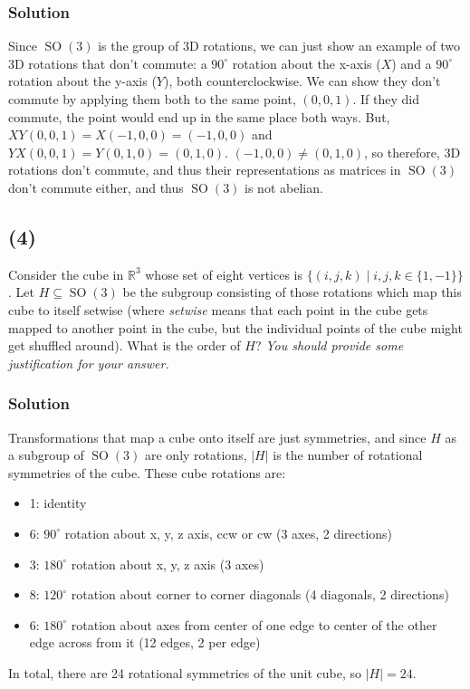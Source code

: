 \documentclass[fleqn]{article}
\DeclareMathOperator{\SO}{SO}
\begin{document}
            \subsubsection{Solution}
            Since $\SO(3)$ is the group of 3D rotations, we can just show an example of two 3D rotations that don't commute: a $90^{\circ}$ rotation about the x-axis ($X$) and a $90^{\circ}$ rotation about the y-axis ($Y$), both counterclockwise.  We can show they don't commute by applying them both to the same point, $(0, 0, 1)$.  If they did commute, the point would end up in the same place both ways.  But, $XY (0, 0, 1) = X (-1, 0, 0) = (-1, 0, 0)$ and $YX (0, 0, 1) = Y (0, 1, 0) = (0, 1, 0)$.  $(-1, 0, 0) \neq (0, 1, 0)$, so therefore, 3D rotations don't commute, and thus their representations as matrices in $\SO(3)$ don't commute either, and thus $\SO(3)$ is not abelian.
        
        \subsection{(4)}
        Consider the cube in $\mathbb{R}^3$ whose set of eight vertices is $\{(i, j, k) \mid i, j, k \in \{1, -1\}\}$.  Let $H \subseteq \SO(3)$ be the subgroup consisting of those rotations which map this cube to itself setwise (where \textit{setwise} means that each point in the cube gets mapped to another point in the cube, but the individual points of the cube might get shuffled around).  What is the order of $H$?  \textit{You should provide some justification for your answer.}
            
            \subsubsection{Solution}
            Transformations that map a cube onto itself are just symmetries, and since $H$ as a subgroup of $\SO(3)$ are only rotations, $|H|$ is the number of rotational symmetries of the cube.  These cube rotations are:
            \begin{itemize}
                \item 1: identity
                \item 6: $90^{\circ}$ rotation about x, y, z axis, ccw or cw (3 axes, 2 directions)
                \item 3: $180^{\circ}$ rotation about x, y, z axis (3 axes)
                \item 8: $120^{\circ}$ rotation about corner to corner diagonals (4 diagonals, 2 directions)
                \item 6: $180^{\circ}$ rotation about axes from center of one edge to center of the other edge across from it (12 edges, 2 per edge)
            \end{itemize}
            In total, there are 24 rotational symmetries of the unit cube, so $|H| = 24$.
        
\end{document}
